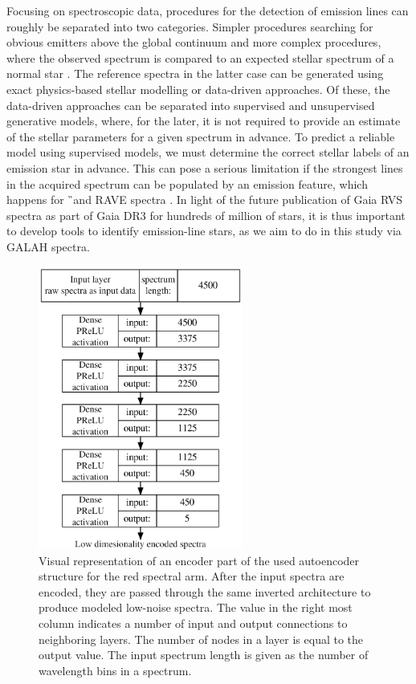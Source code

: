 Focusing on spectroscopic data, procedures for the detection of emission lines can roughly be separated into two categories. Simpler procedures searching for obvious emitters above the global continuum \citep[][]{2015A&A...581A..52T, 2016ASPC..505...66N, 2016RAA....16..138H, 2016ASPC..505...66N} and more complex procedures, where the observed spectrum is compared to an expected stellar spectrum of a normal star \citep[][]{2013ApJ...776..127Z}. The reference spectra in the latter case can be generated using exact physics-based stellar modelling or data-driven approaches. Of these, the data-driven approaches can be separated into supervised and unsupervised generative models, where, for the later, it is not required to provide an estimate of the stellar parameters for a given spectrum in advance. To predict a reliable model using supervised models, we must determine the correct stellar labels of an emission star in advance. This can pose a serious limitation if the strongest lines in the acquired spectrum can be populated by an emission feature, which happens for \G\ and RAVE spectra \citep{2013ApJ...776..127Z}. In light of the future publication of Gaia RVS spectra as part of Gaia DR3 for hundreds of million of stars, it is thus important to develop tools to identify emission-line stars, as we aim to do in this study via GALAH spectra.

\begin{figure}
	\centering
	\includegraphics[width=0.6\textwidth]{ann_network_structure_a.png}
	\caption{Visual representation of an encoder part of the used autoencoder structure for the red spectral arm. After the input spectra are encoded, they are passed through the same inverted architecture to produce modeled low-noise spectra. The value in the right most column indicates a number of input and output connections to neighboring layers. The number of nodes in a layer is equal to the output value. The input spectrum length is given as the number of wavelength bins in a spectrum.}
	\label{fig:autoann}
\end{figure}

